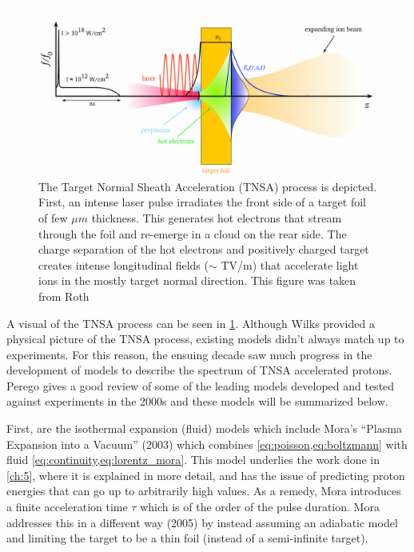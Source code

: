 \begin{figure}
	\centering 
	\includegraphics[width=\linewidth]{planning/images/tnsa.PNG}
	\caption{The Target Normal Sheath Acceleration (TNSA) process is depicted. First, an intense laser pulse irradiates the front side of a target foil of few $\mu m$ thickness. This generates hot electrons that stream through the foil and re-emerge in a cloud on the rear side. The charge separation of the hot electrons and positively charged target creates intense longitudinal fields ($\sim$ TV/m) that accelerate light ions in the mostly target normal direction. This figure was taken from Roth\cite{Roth_2016_CERN_TNSA}}
	\label{fig:tnsa}
\end{figure}

A visual of the TNSA process can be seen in \cref{fig:tnsa}. Although Wilks\cite{Wilks_2001_PoP} provided a physical picture of the TNSA process, existing models didn't always match up to experiments. For this reason, the ensuing decade saw much progress in the development of models to describe the spectrum of TNSA accelerated protons. Perego\cite{Perego_2011_NIaMiP} gives a good review of some of the leading models developed and tested against experiments in the 2000s and these models will be summarized below. 

First, are the isothermal expansion (fluid) models which include Mora's ``Plasma Expansion into a Vacuum''\cite{Mora_2003_PRL} (2003) which combines \cref{eq:poisson,eq:boltzmann} with fluid \cref{eq:continuity,eq:lorentz_mora}. This model underlies the work done in \cref{ch:5}, where it is explained in more detail, and has the issue of predicting proton energies that can go up to arbitrarily high values. As a remedy, Mora introduces a finite acceleration time $\tau$ which is of the order of the pulse duration. Mora\cite{Mora_2005_PRE} addresses this in a different way (2005) by instead assuming an adiabatic model and limiting the target to be a thin foil (instead of a semi-infinite target). 

